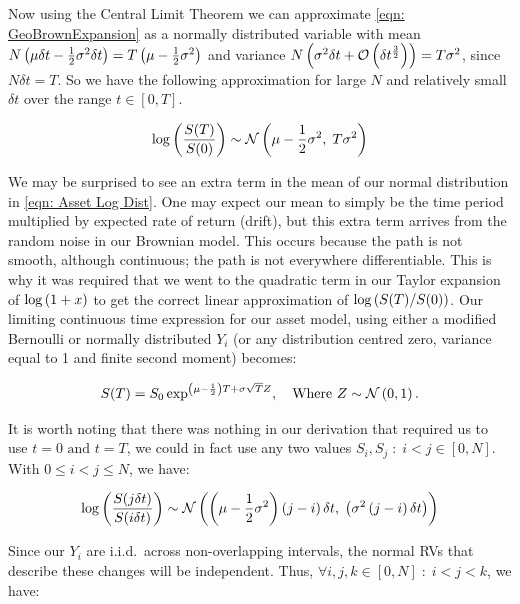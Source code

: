 Now using the Central Limit Theorem we can approximate \autoref{eqn: GeoBrownExpansion} as a normally distributed variable with mean \(N\left(\mu\delta t - \frac{1}{2}\sigma^2\delta t\right) = T\left(\mu - \frac{1}{2}\sigma^2\right)\) and variance \(N\left(\sigma^2\delta t + \mathcal{O}\left(\delta t^\frac{3}{2}\right)\right) = T\sigma^2\), since \(N\delta t = T\). So we have the following approximation for large \(N\) and relatively small \(\delta t\) over the range \(t\in[0,T]\).

\begin{equation}\label{eqn: Asset Log Dist}
    \log\left(\frac{S(T)}{S(0)}\right) \sim \mathcal{N}\left(\mu - \frac{1}{2}\sigma^2,\; T\sigma^2\right)
\end{equation}

We may be surprised to see an extra term in the mean of our normal distribution in \autoref{eqn: Asset Log Dist}. One may expect our mean to simply be the time period multiplied by expected rate of return (drift), but this extra term arrives from the random noise in our Brownian model. This occurs because the path is not smooth, although continuous; the path is not everywhere differentiable. This is why it was required that we went to the quadratic term in our Taylor expansion of \(\log\left(1+x\right)\) to get the correct linear approximation of \(\log\left(S(T)/S(0)\right)\).
\nline{}
Our limiting continuous time expression for our asset model, using either a modified Bernoulli or normally distributed \(Y_i\) (or any distribution centred zero, variance equal to 1 and finite second moment) becomes:

\begin{equation}
    S(T) = S_0\exp^{\left(\mu-\frac{1}{2}\right)T+\sigma\sqrt{T}Z},\quad\text{Where \(Z\sim\mathcal{N}\left(0,1\right). \)}
\end{equation}

It is worth noting that there was nothing in our derivation that required us to use \(t = 0 \text{ and } t = T\), we could in fact use any two values \(S_i, S_j\;:\; i < j\in [0,N]\). With \(0 \leq i < j \leq N\), we have:

\begin{equation}\label{eqn:c1: i,j log distribution}
    \log\left(\frac{S(j\delta t)}{S(i\delta t)}\right) \sim \mathcal{N}\left(\left(\mu - \frac{1}{2}\sigma^2\right)\left(j-i\right)\delta t,\;\left(\sigma^2\left(j-i\right)\delta t\right)\right)
\end{equation}

Since our \(Y_i\) are i.i.d.~across non-overlapping intervals, the normal RVs that describe these changes will be independent. Thus, \(\forall i,j,k \in [0,N]\; : \; i < j < k\), we have:


